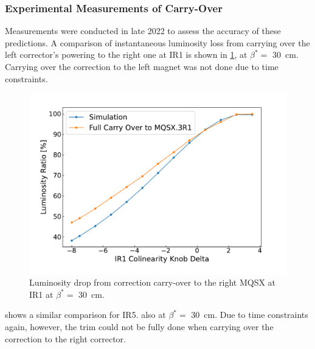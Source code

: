 \subsubsection*{Experimental Measurements of Carry-Over}

Measurements were conducted in late \num{2022} to assess the accuracy of these predictions.
A comparison of instantaneous luminosity loss from carrying over the left corrector's powering to the right one at IR\num{1} is shown in \cref{figure:ir1_carry_over_vs_simulation}, at \(\beta^{\ast} =\) \qty{30}{\centi\meter}.
Carrying over the correction to the left magnet was not done due to time constraints.

\begin{figure}[!htb]
    \centering
    \includegraphics*[width=\textwidth]{Figures/IR_Coupling_Correction/ir1_scan_vs_simu.pdf}
    \caption{Luminosity drop from correction carry-over to the right MQSX at IR\num{1} at \(\beta^{\ast} =\) \qty{30}{\centi\meter}. }
    \label{figure:ir1_carry_over_vs_simulation}
\end{figure}

 shows a similar comparison for IR\num{5}. also at \(\beta^{\ast} =\) \qty{30}{\centi\meter}.
Due to time constraints again, however, the trim could not be fully done when carrying over the correction to the right corrector.

